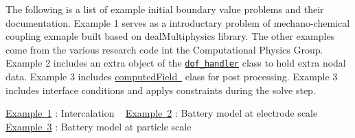 The following is a list of example initial boundary value problems and their documentation. Example 1 serves as a introductary problem of mechano-\/chemical coupling exmaple built based on deal\+Multiphysics library. The other examples come from the various research code int the Computational Physics Group. Example 2 includes an extra object of the \href{https://www.dealii.org/8.5.0/doxygen/deal.II/classDoFHandler.html}{\tt dof\+\_\+handler} class to hold extra nodal data. Example 3 includes \mbox{\hyperlink{classcomputed_field}{computed\+Field }} class for post processing. Example 3 includes interface conditions and applys constraints during the solve step.

\mbox{\hyperlink{_intercalation}{Example 1}} \+: Intercalation ~\newline
 \mbox{\hyperlink{battery_electrode_scale}{Example 2}} \+: Battery model at electrode scale~\newline
\mbox{\hyperlink{battery_particle}{Example 3}} \+: Battery model at particle scale~\newline
